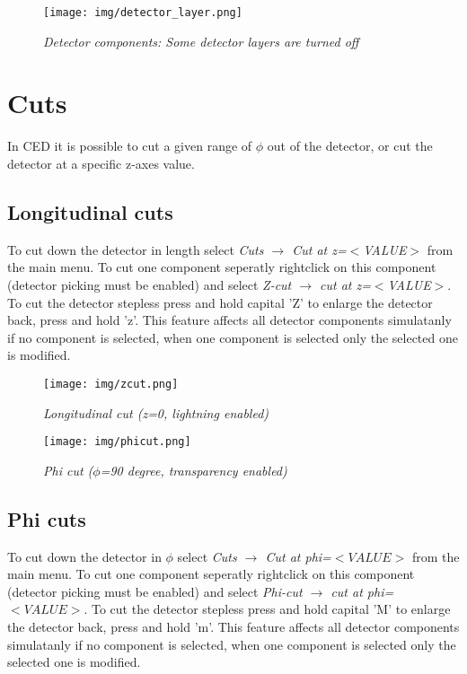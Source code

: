 \documentclass[a4paper,10pt]{article}
\begin{document}
\begin{figure}
\centerline{\texttt{[image: img/detector\_layer.png]}}
\caption{\label{detectorlayer} \textsl{Detector components: Some detector layers are turned off}}
\end{figure}

\section{Cuts}
In CED it is possible to cut a given range of $\phi$ out of the detector, or cut the detector at a specific z-axes value.

\subsection{Longitudinal cuts}
To cut down the detector in length select \textit{Cuts $\to$ Cut at z=$<$VALUE$>$} from the main menu.
To cut one component seperatly rightclick on this component (detector picking must be enabled) and select \textit{Z-cut $\to$ cut at z=$<$VALUE$>$}. 
To cut the detector stepless press and hold capital 'Z' to enlarge the detector back, press and hold 'z'.
This feature affects all detector components simulatanly if no component is selected, when one component is selected only the selected one is modified.

\begin{figure}
\begin{minipage}[t]{6cm}
\centerline{\texttt{[image: img/zcut.png]}}
\caption{\label{CEDViewer} \textsl{Longitudinal cut (z=0, lightning enabled)}}
\end{minipage}
\begin{minipage}[t]{6cm}
\setlength{\fboxsep}{0mm}
\centerline{\texttt{[image: img/phicut.png]}}
\caption{\label{DSTViewer}\textsl{Phi cut ($\phi$=90 degree, transparency enabled)}}
\end{minipage}
\end{figure}



\subsection{Phi cuts}
To cut down the detector in $\phi$ select \textit{Cuts $\to$ Cut at phi=$<VALUE>$} from the main menu.
To cut one component seperatly rightclick on this component (detector picking must be enabled) and select \textit{Phi-cut $\to$ cut at phi=$<VALUE>$}. 
To cut the detector stepless press and hold capital 'M' to enlarge the detector back, press and hold 'm'.
This feature affects all detector components simulatanly if no component is selected, when one component is selected only the selected one is modified.
\end{document}
